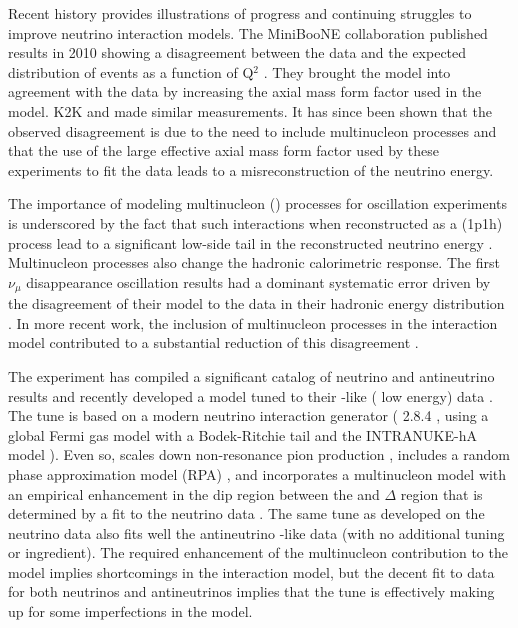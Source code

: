 Recent history provides illustrations of progress and continuing struggles to improve neutrino interaction models.  The MiniBooNE collaboration published results in 2010 showing a disagreement between the data and the expected distribution of  events as a function of Q$^{2}$ \cite{AguilarArevalo:2010cx,Gran:2006jn}.   They brought the model into agreement with the data by increasing the axial mass form factor used in the model.  K2K \cite{Gran:2006jn} and  \cite{Adamson:2014pgc} made similar measurements.  It has since been shown that the observed disagreement is due to the need to include multinucleon processes and that the use of the large effective axial mass form factor used by these experiments to fit the data leads to a misreconstruction of the neutrino energy.  

The importance of modeling multinucleon () processes for oscillation experiments is underscored by the fact that such interactions when reconstructed as a  (1p1h) process lead to a significant low-side tail in the reconstructed neutrino energy \cite{Martini:2012uc}.  Multinucleon processes also change the hadronic calorimetric response.  The first    $\nu_{\mu}$ disappearance oscillation results had a dominant systematic error driven by the disagreement of their model to the data in their hadronic energy distribution \cite{Adamson:2016xxw}.  In more recent work, the inclusion of multinucleon processes in the interaction model contributed to a substantial reduction of this disagreement \cite{NOvA:2018gge}.

The  experiment has compiled a significant catalog of neutrino and antineutrino results and recently developed a model tuned to their -like  ( low energy) data \cite{Ruterbories:2018gub}.  The tune is based on a modern neutrino interaction generator ( 2.8.4 \cite{Andreopoulos:2009rq}, using a global Fermi gas model \cite{Smith:1972xh}  with a Bodek-Ritchie tail \cite{Bodek:1981wr} and the INTRANUKE-hA  model \cite{Dytman:2007zz}).  Even so,  scales down non-resonance pion production \cite{Rodrigues:2016xjj}, includes a random phase approximation model (RPA) \cite{Nieves:2004wx,Gran:2017psn}, and incorporates a multinucleon model \cite{Nieves:2011pp, Gran:2013kda, Schwehr:2016pvn} with an empirical enhancement in the dip region between the  and $\Delta$  region that is determined by a fit to the neutrino data \cite{Ruterbories:2018gub}.  The same tune as developed on the neutrino data also fits well the  antineutrino -like data (with no additional tuning or ingredient).  The required enhancement of the multinucleon contribution to the model implies shortcomings in the interaction model, but the decent fit to data for both neutrinos and antineutrinos implies that the tune is effectively making up for some imperfections in the model. 

